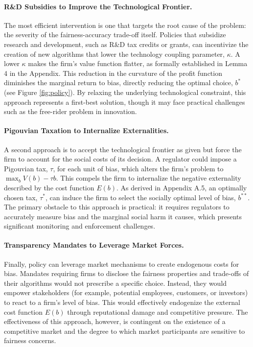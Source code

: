 \paragraph{R\&D Subsidies to Improve the Technological Frontier.}
The most efficient intervention is one that targets the root cause of the problem: the severity of the fairness-accuracy trade-off itself. Policies that subsidize research and development, such as R\&D tax credits or grants, can incentivize the creation of new algorithms that lower the technology coupling parameter, $\kappa$. A lower $\kappa$ makes the firm's value function flatter, as formally established in Lemma 4 in the Appendix. This reduction in the curvature of the profit function diminishes the marginal return to bias, directly reducing the optimal choice, $b^*$ (see Figure \ref{fig:policy}). By relaxing the underlying technological constraint, this approach represents a first-best solution, though it may face practical challenges such as the free-rider problem in innovation.

\paragraph{Pigouvian Taxation to Internalize Externalities.}
A second approach is to accept the technological frontier as given but force the firm to account for the social costs of its decision. A regulator could impose a Pigouvian tax, $\tau$, for each unit of bias, which alters the firm's problem to $\max_b V(b) - \tau b$. This compels the firm to internalize the negative externality described by the cost function $E(b)$. As derived in Appendix A.5, an optimally chosen tax, $\tau^*$, can induce the firm to select the socially optimal level of bias, $b^{**}$. The primary obstacle to this approach is practical: it requires regulators to accurately measure bias and the marginal social harm it causes, which presents significant monitoring and enforcement challenges.

\paragraph{Transparency Mandates to Leverage Market Forces.}
Finally, policy can leverage market mechanisms to create endogenous costs for bias. Mandates requiring firms to disclose the fairness properties and trade-offs of their algorithms would not prescribe a specific choice. Instead, they would empower stakeholders (for example, potential employees, customers, or investors) to react to a firm's level of bias. This would effectively endogenize the external cost function $E(b)$ through reputational damage and competitive pressure. The effectiveness of this approach, however, is contingent on the existence of a competitive market and the degree to which market participants are sensitive to fairness concerns.

